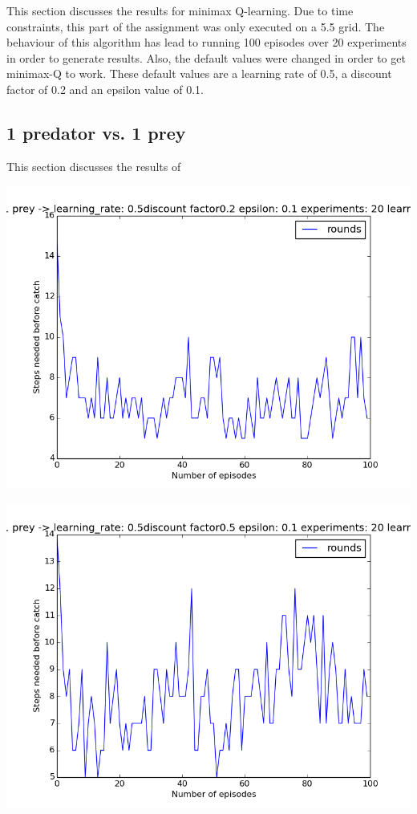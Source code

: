 This section discusses the results for minimax Q-learning. Due to time constraints, this part of the assignment was only executed on a 5.5 grid. The behaviour of this algorithm has lead to running 100 episodes over 20 experiments in order to generate results. Also, the default values were changed in order to get minimax-Q to work. These default values are a learning rate of 0.5, a discount factor of 0.2 and an epsilon value of 0.1.

\subsection{1 predator vs. 1 prey}
This section discusses the results of 
\begin{center}
	\includegraphics[scale=0.3]{minimax_100rounds_20exp_disc02_alpha05}
	\label{graph:1vs1_disc_02}
\end{center}

\begin{center}
	\includegraphics[scale=0.3]{minimax_100rounds_20exp_disc05_alpha05}
	\label{graph:1vs1_disc_05}
\end{center}

